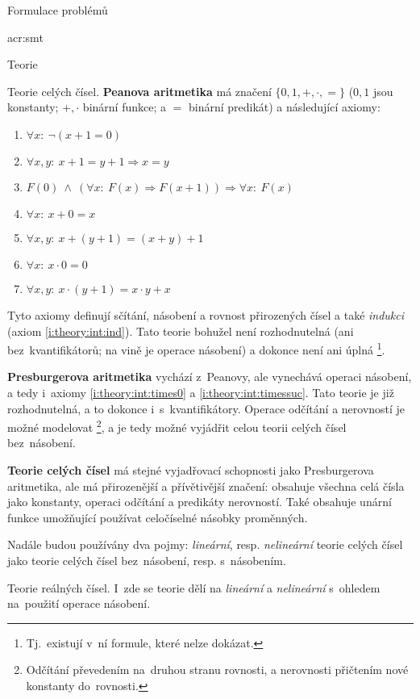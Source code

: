 \documentclass[thesis=M,czech]{FITthesis}[2012/06/26]
\newcommand{\acrlabel}[1]{acr:#1}
\newcommand{\acrf}[1]{\acrfull{\acrlabel{#1}}}
\newcommand{\hl}[1]{\textit{#1}}
\newcommand{\hll}[1]{\textbf{#1}}
\newcommand{\name}[1]{\hl{#1}}
\newcommand{\rf}[1]{\ref{#1}}
\begin{document}
\begin{section}{Formulace problémů}
\begin{subsection}{\acrf{smt}}
\begin{subsubsection}{Teorie}
\begin{paragraph}{Teorie celých čísel.}
\hll{Peanova aritmetika} má značení
$\{ {0, 1}, {+, \cdot}, = \}$
(${0,1}$ jsou konstanty;
${+,\cdot}$ binární funkce;
a $=$ binární predikát)
a následující axiomy:
\begin{enumerate}
\item $\forall x : \: \neg ( x + 1 = 0 )$
\item $\forall x,y : \: x+1 = y+1 \Rightarrow x = y$
\item \label{i:theory:int:ind}
   $F(0) \: \land \: \left( \forall x : \: F(x) \Rightarrow F(x+1) \right)
      \Rightarrow \forall x : \: F(x)$
\item $\forall x : \: x+0 = x$
\item $\forall x,y : \: x + (y+1) = (x+y) + 1$
\item \label{i:theory:int:times0}
   $\forall x : \: x \cdot 0 = 0$
\item \label{i:theory:int:timessuc}
   $\forall x,y : \: x \cdot (y+1) = x \cdot y + x$
\end{enumerate}
Tyto axiomy definují sčítání, násobení a rovnost
přirozených čísel a také \name{indukci}
(axiom \rf{i:theory:int:ind}).
Tato teorie bohužel není rozhodnutelná
(ani bez~kvantifikátorů;
na vině je operace násobení)
a dokonce není ani úplná%
\footnote{Tj.~existují v~ní formule, které nelze dokázat.}.

\hll{Presburgerova aritmetika} vychází z~Peanovy,
ale vynechává operaci násobení,
a tedy i~axiomy \rf{i:theory:int:times0} a \rf{i:theory:int:timessuc}.
Tato teorie je již rozhodnutelná,
a to dokonce i~s~kvantifikátory.
Operace odčítání a nerovností je možné modelovat%
\footnote{Odčítání převedením na~druhou stranu rovnosti,
a nerovnosti přičtením nové konstanty do~rovnosti.},
a je tedy možné vyjádřit celou teorii celých čísel
bez~násobení.

\hll{Teorie celých čísel} má stejné vyjadřovací schopnosti
jako Presburgerova aritmetika,
ale má přirozenější a přívětivější značení:
obsahuje všechna celá čísla jako konstanty,
operaci odčítání a predikáty nerovností.
Také obsahuje unární funkce
umožňující používat celočíselné násobky proměnných.

Nadále budou používány dva pojmy:
\hl{lineární}, resp. \hl{nelineární}
teorie celých čísel
jako teorie celých čísel bez~násobení,
resp. s~násobením.
\end{paragraph} %


\begin{paragraph}{Teorie reálných čísel.}
\label{p:theory:formulation:smt:theory:real}
I~zde se teorie dělí na \hl{lineární} a \hl{nelineární}
s~ohledem na~použití operace násobení.


\end{paragraph}
\end{subsubsection}
\end{subsection}
\end{section}
\end{document}
